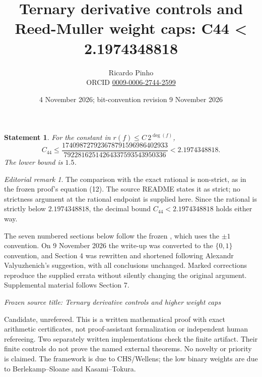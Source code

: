 \documentclass[11pt]{article}
\title{Ternary derivative controls and Reed-Muller weight caps: C44 < 2.1974348818}
\author{Ricardo Pinho\\\small ORCID \href{https://orcid.org/0009-0006-2744-2599}{0009-0006-2744-2599}}
\date{4 November 2026; bit-convention revision 9 November 2026}
\newtheorem*{claim}{Statement}
\theoremstyle{remark}
\newtheorem*{editorial}{Editorial remark}
\theoremstyle{correctionstyle}
\begin{document}
\maketitle
\begin{center}
\end{center}
\begin{claim}
For the constant in $r(f)\le C\,2^{\deg(f)}$,
\[
C_{44}\le\frac{174098727923678791596986402933}{79228162514264337593543950336}<2.1974348818.
\]
The lower bound is $1.5$.
\end{claim}
\begin{editorial}
The comparison with the exact rational is non-strict, as in the frozen
proof's equation (12). The source README states it as strict; no strictness
argument at the rational endpoint is supplied here. Since the rational is
strictly below $2.1974348818$, the decimal bound $C_{44}<2.1974348818$ holds either way.
\end{editorial}
The seven numbered sections below follow the frozen , which uses
the $\pm1$ convention. On 9 November 2026 the write-up was converted to the
$\{0,1\}$ convention, and Section 4 was rewritten and shortened following
Alexandr Valyuzhenich's suggestion, with all conclusions unchanged.
Marked corrections reproduce the supplied errata without silently changing
the original argument. Supplemental material follows Section 7.

\textit{Frozen source title: Ternary derivative controls and higher weight caps}\label{src-p001}\label{src-end-p001}

\leavevmode\label{src-p002}Candidate, unrefereed. This is a written mathematical proof with exact
arithmetic certificates, not proof-assistant formalization or independent
human refereeing. Two separately written implementations check the finite
artifact. Their finite controls do not prove the named external theorems.
No novelty or priority is claimed. The framework is due to CHS/Wellens; the
low binary weights are due to Berlekamp–Sloane and Kasami–Tokura.\label{src-end-p002}\par
\end{document}
